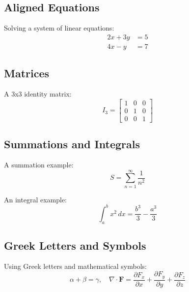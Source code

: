 \subsection*{Aligned Equations}
Solving a system of linear equations:
\begin{align*}
2x + 3y &= 5 \\
4x -  y &= 7
\end{align*}

\subsection*{Matrices}
A 3x3 identity matrix:
\[
I_3 = 
\begin{bmatrix}
1 & 0 & 0 \\
0 & 1 & 0 \\
0 & 0 & 1
\end{bmatrix}
\]

\subsection*{Summations and Integrals}
A summation example:
\[
S = \sum_{n=1}^\infty \frac{1}{n^2}
\]

An integral example:
\[
\int_a^b x^2 \, dx = \frac{b^3}{3} - \frac{a^3}{3}
\]

\subsection*{Greek Letters and Symbols}
Using Greek letters and mathematical symbols:
\[
\alpha + \beta = \gamma, \quad \nabla \cdot \mathbf{F} = \frac{\partial F_x}{\partial x} + \frac{\partial F_y}{\partial y} + \frac{\partial F_z}{\partial z}
\]
